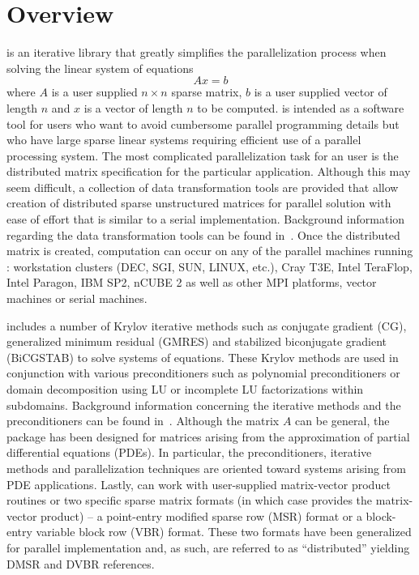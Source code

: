 \section{Overview\label{overview}}
\Az{} is an iterative library that greatly simplifies the parallelization
process when solving the linear system of equations \[ Ax = b \] where $A$ is a
user supplied $n \times n$ sparse matrix, $b$ is a user supplied vector of
length $n$ and $x$ is a vector of length $n$ to be computed.  \Az{} is intended
as a software tool for users who want to avoid cumbersome parallel programming
details but who have large sparse linear systems requiring efficient use of a
parallel processing system.  The most complicated parallelization task for an
\Az{} user is the distributed matrix specification for the particular
application.  Although this may seem difficult, a collection of data
transformation tools are provided that allow creation of distributed sparse
unstructured matrices for parallel solution with ease of effort that is similar
to a serial implementation.  Background information regarding the data
transformation tools can be found in~\cite{aztec-utils}. Once the distributed
matrix is created, computation can occur on any of the parallel machines
running \Az{}: 
workstation clusters (DEC, SGI, SUN, LINUX, etc.), Cray T3E,  
Intel TeraFlop, Intel Paragon, IBM SP2, nCUBE 2 as well as other 
MPI platforms, vector machines or serial machines.

\Az{} includes a number of Krylov iterative methods such as conjugate gradient
(CG), generalized minimum residual (GMRES) and stabilized biconjugate gradient
(BiCGSTAB) to solve systems of equations.  These Krylov methods are used in
conjunction with various preconditioners such as polynomial preconditioners or
domain decomposition using LU or incomplete LU factorizations within
subdomains.  Background information concerning the iterative methods and the
preconditioners can be found in~\cite{aztec-alg}.  Although the matrix $A$ can
be general, the package has been designed for matrices arising from the
approximation of partial differential equations (PDEs). In particular, the
preconditioners, iterative methods and parallelization techniques are oriented
toward systems arising from PDE applications.  Lastly, \Az{} can work
with user-supplied matrix-vector product routines or two specific
sparse matrix formats 
(in which case \Az{} provides the matrix-vector product)
-- a point-entry modified sparse row
(MSR) format or a block-entry variable block row (VBR) format.  These two
formats have been generalized for parallel implementation and, as such, are
referred to as ``distributed'' yielding DMSR and DVBR references.

